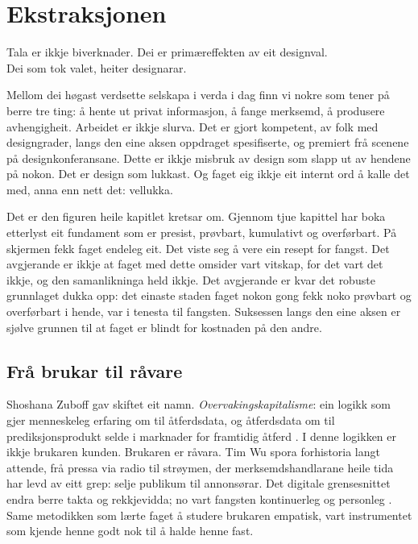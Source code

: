 \chapter{Ekstraksjonen}

\begin{motto}
Tala er ikkje biverknader. Dei er primæreffekten av eit designval.\\ Dei som tok valet, heiter designarar.
\end{motto}

Mellom dei høgast verdsette selskapa i verda i dag finn vi nokre som tener på berre tre ting: å hente ut privat informasjon, å fange merksemd, å produsere avhengigheit. Arbeidet er ikkje slurva. Det er gjort kompetent, av folk med designgrader, langs den eine aksen oppdraget spesifiserte, og premiert frå scenene på designkonferansane. Dette er ikkje misbruk av design som slapp ut av hendene på nokon. Det er design som lukkast. Og faget eig ikkje eit internt ord å kalle det med, anna enn nett det: vellukka.

Det er den figuren heile kapitlet kretsar om. Gjennom tjue kapittel har boka etterlyst eit fundament som er presist, prøvbart, kumulativt og overførbart. På skjermen fekk faget endeleg eit. Det viste seg å vere ein resept for fangst. Det avgjerande er ikkje at faget med dette omsider vart vitskap, for det vart det ikkje, og den samanlikninga held ikkje. Det avgjerande er kvar det robuste grunnlaget dukka opp: det einaste staden faget nokon gong fekk noko prøvbart og overførbart i hende, var i tenesta til fangsten. Suksessen langs den eine aksen er sjølve grunnen til at faget er blindt for kostnaden på den andre.

\section{Frå brukar til råvare}

Shoshana Zuboff gav skiftet eit namn. \emph{Overvakingskapitalisme}: ein logikk som gjer menneskeleg erfaring om til åtferdsdata, og åtferdsdata om til prediksjonsprodukt selde i marknader for framtidig åtferd \autocite{zuboff2019}. I denne logikken er ikkje brukaren kunden. Brukaren er råvara. Tim Wu spora forhistoria langt attende, frå pressa via radio til strøymen, der merksemdshandlarane heile tida har levd av eitt grep: selje publikum til annonsørar. Det digitale grensesnittet endra berre takta og rekkjevidda; no vart fangsten kontinuerleg og personleg \autocite{wu2016}. Same metodikken som lærte faget å studere brukaren empatisk, vart instrumentet som kjende henne godt nok til å halde henne fast.

